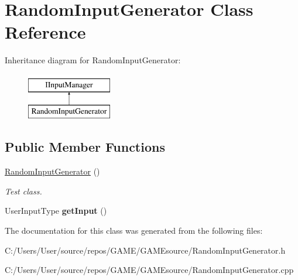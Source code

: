 \hypertarget{class_random_input_generator}{}\section{Random\+Input\+Generator Class Reference}
\label{class_random_input_generator}
Inheritance diagram for Random\+Input\+Generator\+:\begin{figure}[H]
\begin{center}
\leavevmode
\includegraphics[height=2.000000cm]{class_random_input_generator}
\end{center}
\end{figure}
\subsection*{Public Member Functions}
\begin{DoxyCompactItemize}
\item 
\mbox{\label{class_random_input_generator_afd6c995d37855154f296050304307ee4}} 
\mbox{\hyperlink{class_random_input_generator_afd6c995d37855154f296050304307ee4}{Random\+Input\+Generator}} ()
\begin{DoxyCompactList}\small\item\em Test class. \end{DoxyCompactList}\item 
\mbox{\label{class_random_input_generator_a519c2556c497b6b5ab521334d39749d9}} 
User\+Input\+Type {\bfseries get\+Input} ()
\end{DoxyCompactItemize}


The documentation for this class was generated from the following files\+:\begin{DoxyCompactItemize}
\item 
C\+:/\+Users/\+User/source/repos/\+G\+A\+M\+E/\+G\+A\+M\+Esource/Random\+Input\+Generator.\+h\item 
C\+:/\+Users/\+User/source/repos/\+G\+A\+M\+E/\+G\+A\+M\+Esource/Random\+Input\+Generator.\+cpp\end{DoxyCompactItemize}
